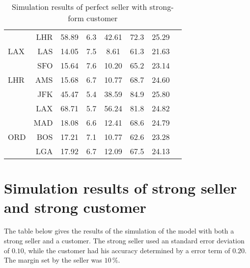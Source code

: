 \begin{table}[h]
\begin{center}
\begin{tabular}{l r c c c c c c}
     &  LHR &   58.89  &     6.3  &   42.61  &    72.3  &   25.29  \\[.5ex]
LAX  &  LAS &   14.05  &     7.5  &    8.61  &    61.3  &   21.63  \\
     &  SFO &   15.64  &     7.6  &   10.20  &    65.2  &   23.14  \\[.5ex]
LHR  &  AMS &   15.68  &     6.7  &   10.77  &    68.7  &   24.60  \\
     &  JFK &   45.47  &     5.4  &   38.59  &    84.9  &   25.80  \\
     &  LAX &   68.71  &     5.7  &   56.24  &    81.8  &   24.82  \\
     &  MAD &   18.08  &     6.6  &   12.41  &    68.6  &   24.79  \\[.5ex]
ORD  &  BOS &   17.21  &     7.1  &   10.77  &    62.6  &   23.28  \\
     &  LGA &   17.92  &     6.7  &   12.09  &    67.5  &   24.13  \\
            \bottomrule
        \end{tabular}
        \caption{Simulation results of perfect seller with strong-form customer}
        \label{tbl:resultsPerfectStrong}
    \end{center}
\end{table}



\chapter{Simulation results of strong seller and strong customer}
\label{app:SimulationResultsStrongStrong}
The table below gives the results of the simulation of the model with both a strong seller and a customer. The strong seller used an standard error deviation of $0.10$, while the customer had his accuracy determined by a error term of $0.20$. The margin set by the seller was $10\,\%$.


